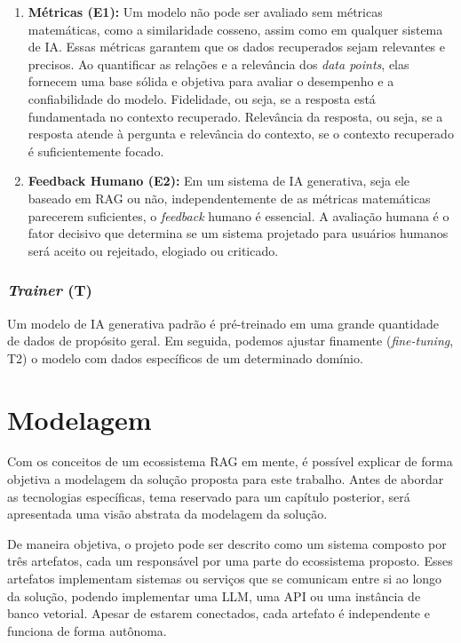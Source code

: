 \documentclass[a4paper, 12pt]{article}
\begin{document}
    \begin{enumerate}
        \item \textbf{Métricas (E1):} Um modelo não pode ser avaliado sem métricas matemáticas, como a similaridade cosseno, assim como em qualquer sistema de IA. Essas métricas garantem que os dados recuperados sejam relevantes e precisos. Ao quantificar as relações e a relevância dos \textit{data points}, elas fornecem uma base sólida e objetiva para avaliar o desempenho e a confiabilidade do modelo. Fidelidade, ou seja, se a resposta está fundamentada no contexto recuperado. Relevância da resposta, ou seja, se a resposta atende à pergunta e relevância do contexto, se o contexto recuperado é suficientemente focado.
        \item \textbf{Feedback Humano (E2):} \label{sec:human_feedback} Em um sistema de IA generativa, seja ele baseado em RAG ou não, independentemente de as métricas matemáticas parecerem suficientes, o \textit{feedback} humano é essencial. A avaliação humana é o fator decisivo que determina se um sistema projetado para usuários humanos será aceito ou rejeitado, elogiado ou criticado.
    \end{enumerate}
    
    \subsubsection{\textit{Trainer} (T)}

    Um modelo de IA generativa padrão é pré-treinado em uma grande quantidade de dados de propósito geral. Em seguida, podemos ajustar finamente (\textit{fine-tuning}, T2) o modelo com dados específicos de um determinado domínio.
    
    \clearpage
    
    \section{Modelagem}

    Com os conceitos de um ecossistema RAG em mente, é possível explicar de forma objetiva a modelagem da solução proposta para este trabalho. Antes de abordar as tecnologias específicas, tema reservado para um capítulo posterior, será apresentada uma visão abstrata da modelagem da solução.

    De maneira objetiva, o projeto pode ser descrito como um sistema composto por três artefatos, cada um responsável por uma parte do ecossistema proposto. Esses artefatos implementam sistemas ou serviços que se comunicam entre si ao longo da solução, podendo implementar uma LLM, uma API ou uma instância de banco vetorial. Apesar de estarem conectados, cada artefato é independente e funciona de forma autônoma.
    
\end{document}
